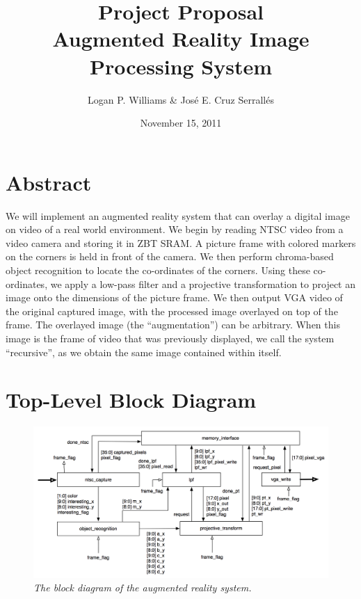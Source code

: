 \documentclass[10pt]{article}
\begin{document}
\title{Project Proposal\\Augmented Reality Image Processing System}
\author{Logan P. Williams \& Jos\'{e} E. Cruz Serrall\'{e}s}
\date{November 15, 2011}
\maketitle



\section*{Abstract}
We will implement an augmented reality system that can overlay a digital image on video of a real world environment. We begin by reading NTSC video from a video camera and storing it in ZBT SRAM. A picture frame with colored markers on the corners is held in front of the camera. We then perform chroma-based object recognition to locate the co-ordinates of the corners. Using these co-ordinates, we apply a low-pass filter and a projective transformation to project an image onto the dimensions of the picture frame. We then output VGA video of the original captured image, with the processed image overlayed on top of the frame. The overlayed image (the ``augmentation'') can be arbitrary. When this image is the frame of video that was previously displayed, we call the system ``recursive'', as we obtain the same image contained within itself.

\tableofcontents


\section{Top-Level Block Diagram}
\begin{figure}[h!]
\centering
\includegraphics[width=\textwidth]{block_diagram_with_wires.png}
\caption{\emph{The block diagram of the augmented reality system.}}
\end{figure}
\end{document}
